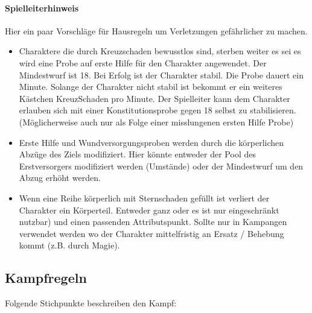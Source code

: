 \documentclass{article}
\begin{document}
\begin{mdframed}[hidealllines=true, backgroundcolor=black!10]
\paragraph{Spielleiterhinweis}

Hier ein paar Vorschläge für Hausregeln um Verletzungen gefährlicher zu machen.

\begin{itemize}
\item Charaktere die durch Kreuzschaden bewusstlos sind, sterben weiter es sei es wird eine Probe auf erste Hilfe für den Charakter angewendet. Der Mindestwurf ist 18. Bei Erfolg ist der Charakter stabil. Die Probe dauert ein Minute. Solange der Charakter nicht stabil ist bekommt er ein weiteres Kästchen KreuzSchaden pro Minute. Der Spielleiter kann dem Charakter erlauben sich mit einer Konstitutionsprobe gegen 18 selbst zu stabilisieren. (Möglicherweise auch nur als Folge einer misslungenen ersten Hilfe Probe)
\item Erste Hilfe und Wundversorgungsproben werden durch die körperlichen Abzüge des Ziels modifiziert. Hier könnte entweder der Pool des Erstversorgers modifiziert werden (Umstände) oder der Mindestwurf um den Abzug erhöht werden.
\item Wenn eine Reihe körperlich mit Sternschaden gefüllt ist verliert der Charakter ein Körperteil. Entweder ganz oder es ist nur eingeschränkt nutzbar) und einen passenden Attributspunkt. Sollte nur in Kampangen verwendet werden wo der Charakter mittelfristig an Ersatz / Behebung kommt (z.B. durch Magie).
\end{itemize}

\end{mdframed}
\begin{center}
\subsection{Kampfregeln}
\end{center}

Folgende Stichpunkte beschreiben den Kampf:
\end{document}
